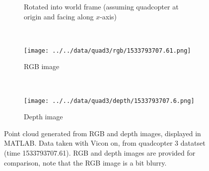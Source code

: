 \documentclass[12pt,a4paper]{article}
\begin{document}
\begin{figure}[h]
\begin{subfigure}[t]{0.5\textwidth}
    \caption{Rotated into world frame (assuming quadcopter at origin and facing along $x$-axis)}
  \end{subfigure}
  \\
  \begin{subfigure}[t]{0.5\textwidth}
  \centering
    \texttt{[image: ../../data/quad3/rgb/1533793707.61.png]}
    \caption{RGB image}
  \end{subfigure}%
  ~
  \begin{subfigure}[t]{0.5\textwidth}
  \centering
    \texttt{[image: ../../data/quad3/depth/1533793707.6.png]}
    \caption{Depth image}
  \end{subfigure}  
  \caption{Point cloud generated from RGB and depth images, displayed in MATLAB. Data taken with Vicon on, from quadcopter 3 datatset (time 1533793707.61). RGB and depth images are provided for comparison, note that the RGB image is a bit blurry.}
  \label{f: quad3 bad pc}
\end{figure}
\end{document}
